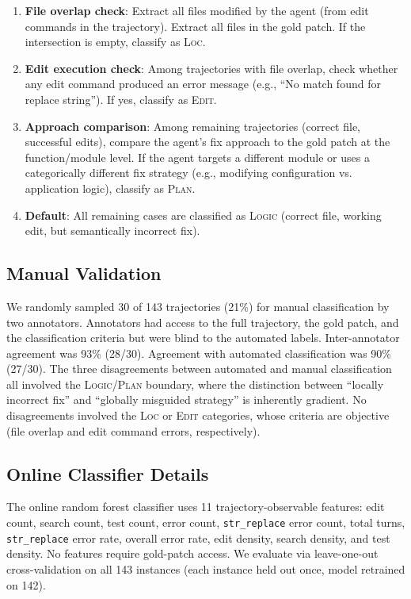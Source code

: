 \documentclass[11pt]{article}
\begin{document}
\begin{enumerate}
\item \textbf{File overlap check}: Extract all files modified by the agent (from edit commands in the trajectory). Extract all files in the gold patch. If the intersection is empty, classify as \textsc{Loc}.
\item \textbf{Edit execution check}: Among trajectories with file overlap, check whether any edit command produced an error message (e.g., ``No match found for replace string''). If yes, classify as \textsc{Edit}.
\item \textbf{Approach comparison}: Among remaining trajectories (correct file, successful edits), compare the agent's fix approach to the gold patch at the function/module level. If the agent targets a different module or uses a categorically different fix strategy (e.g., modifying configuration vs. application logic), classify as \textsc{Plan}.
\item \textbf{Default}: All remaining cases are classified as \textsc{Logic} (correct file, working edit, but semantically incorrect fix).
\end{enumerate}

\subsection{Manual Validation}

We randomly sampled 30 of 143 trajectories (21\%) for manual classification by two annotators.
Annotators had access to the full trajectory, the gold patch, and the classification criteria but were blind to the automated labels.
Inter-annotator agreement was 93\% (28/30). Agreement with automated classification was 90\% (27/30).
The three disagreements between automated and manual classification all involved the \textsc{Logic}/\textsc{Plan} boundary, where the distinction between ``locally incorrect fix'' and ``globally misguided strategy'' is inherently gradient.
No disagreements involved the \textsc{Loc} or \textsc{Edit} categories, whose criteria are objective (file overlap and edit command errors, respectively).

\subsection{Online Classifier Details}
\label{app:classifier-details}

The online random forest classifier uses 11 trajectory-observable features: edit count, search count, test count, error count, \texttt{str\_replace} error count, total turns, \texttt{str\_replace} error rate, overall error rate, edit density, search density, and test density.
No features require gold-patch access.
We evaluate via leave-one-out cross-validation on all 143 instances (each instance held out once, model retrained on 142).
\end{document}
